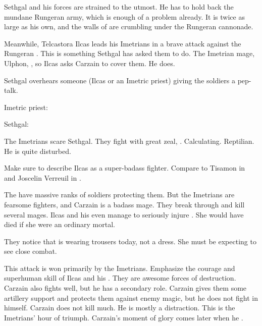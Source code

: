 \begin{comment}
  \subsection{Ilcas-tachi attack the \ishrah}
\end{comment}
\new
{}
Sethgal and his forces are strained to the utmost.
He has to hold back the mundane Rungeran army, which is enough of a problem already.
It is twice as large as his own, and the walls of \Forclin are crumbling under the Rungeran cannonade. 

Meanwhile, Telcastora Ilcas leads his Imetrians in a brave attack against the Rungeran \ishrah.
This is something Sethgal has asked them to do. 
The Imetrian mage, Ulphon, , so Ilcas asks Carzain to cover them. 
He does. 

Sethgal overhears someone (Ilcas or an Imetric priest) giving the soldiers a pep-talk. 

\begin{prose}
  Imetric priest: 
  
  Sethgal: 
\end{prose}

The Imetrians scare Sethgal. 
They fight with great zeal, . 
Calculating. 
Reptilian. 
He is quite disturbed.

Make sure to describe Ilcas as a super-badass fighter. 
Compare to Tisamon in \cite{AdrianTchaikovsky:ShadowsoftheApt} and Joscelin Verreuil in \cite{JacquelineCarey:KushielsLegacy}. 

The \ishrah have massive ranks of soldiers protecting them.
But the Imetrians are fearsome fighters, and Carzain is a badass mage.
They break through and kill several mages. 
Ilcas and his \nycans even manage to seriously injure \Takestsha. 
She would have died if she were an ordinary mortal. 

They notice that \Takestsha is wearing trousers today, not a dress. 
She must be expecting to see close combat. 

This attack is won primarily by the Imetrians. 
Emphasize the courage and superhuman skill of Ilcas and his \nycans. 
They are awesome forces of destruction. 
Carzain also fights well, but he has a secondary role. 
Carzain gives them some artillery support and protects them against enemy magic, but he does not fight in \melee himself.
Carzain does not kill much.
He is mostly a distraction. 
This is the Imetrians' hour of triumph. 
Carzain's moment of glory comes later when he . 

